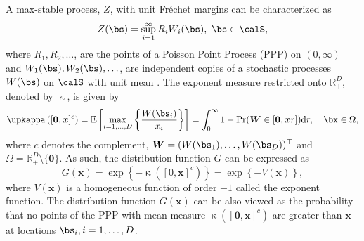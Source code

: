 \documentclass[12pt]{article}
\begin{document}
A max-stable process, $Z$,  with unit Fr\'{e}chet margins can be characterized as
\begin{equation}
\label{eq:spectralrepresentation}
	Z(\bs) = \sup_{i=1}^\infty R_iW_i(\bs),\ \bs\in\calS, 
\end{equation}
%
where $R_1, R_2, \ldots$, are the points of a Poisson Point Process (PPP) on $(0, \infty)$ 
and $W_1(\bs), W_2(\bs), \ldots$, are independent copies of a stochastic processes $W(\bs)$ on $\calS$ with unit mean \citep{deHaan.Ferreira:2006, Schlather:2002}.
%
The exponent measure restricted onto $\mathbb R^D_+$, denoted by $\upkappa$, is given by
%
\begin{equation}
\label{eq:exponentmeasure}
\upkappa \left([\bm 0,\bm x]^c\right)
= \mathbb E\left[\max_{i=1, \ldots, D} \left\{\frac{W(\bs_i)}{x_i}\right\} \right] 
= \int_0^\infty 1 - \Pr(\bm W \in [\bm 0,\bm xr ])\text dr,	
\quad \bx \in \Omega,
\end{equation}
%
where $c$ denotes the complement, $\bm W=(W(\bs_1),\dots,W(\bs_D))^\top$ and $\Omega = \mathbb R^{D}_+ \setminus \{\bm 0\}$. As such, the distribution function $G$ can be expressed as
\begin{equation}
\label{eq:ppp}
G(\bm x) = \exp\left\{-\upkappa([0,\bm x]^c)\right\} = \exp\left\{-V(\bm x)\right\},
\end{equation}
%
where $V(\bm x)$ is a homogeneous function of order $-1$ called the exponent function. The distribution function $G(\bm x)$ can be also viewed as the probability that no points of the PPP with mean measure $\upkappa \left([\bm 0,\bm x]^c\right)$ are greater than $\bm x$ at locations $\bs_i,i=1,\dots,D$.     
\end{document}
